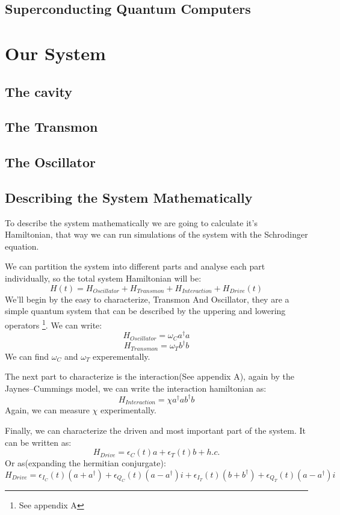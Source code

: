 \documentclass{article}
\begin{document}
\subsection{Superconducting Quantum Computers}

\newpage
\section{Our System}

\subsection{The cavity}

\subsection{The Transmon}

\subsection{The Oscillator}

\subsection{Describing the System Mathematically}
To describe the system mathematically we are going to calculate it's Hamiltonian, that way we can run simulations of the system with the Schrodinger equation.\par
We can partition the system into different parts and analyse each part individually, so the total system Hamiltonian will be:
$$H(t) = H_{Oscillator} + H_{Transmon}+ H_{Interaction} + H_{Drive}(t)$$
We'll begin by the easy to characterize, Transmon And Oscillator, they are a simple quantum system that can be described by the uppering and lowering operators \footnote{See appendix A}. We can write:
$$H_{Oscillator} = \omega_C a^\dag{}a$$
$$H_{Transmon} = \omega_T b^\dag{}b$$
We can find $\omega_C$ and $\omega_T$ experementally. %
\par
The next part to characterize is the interaction(See appendix A), again by the Jaynes–Cummings model, we can write the interaction hamiltonian as:
$$H_{Interaction} = \chi a^\dag{} a  b^\dag{} b$$ %
Again, we can measure $\chi$ experimentally.  %
\par
Finally, we can characterize the driven and most important part of the system. It can be written as: %
$$H_{Drive} = \epsilon_C(t)a + \epsilon_T(t)b + h.c.$$
Or as(expanding the hermitian conjurgate):
$$H_{Drive} = \epsilon_{I_C}(t)(a + a^\dag{}) + \epsilon_{Q_C}(t)(a - a^\dag{})i + \epsilon_{I_T}(t)(b + b^\dag{})+ \epsilon_{Q_T}(t)(a - a^\dag{})i$$
\end{document}
